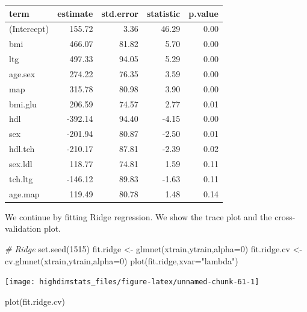\documentclass[
]{book}
\newenvironment{Shaded}{\begin{snugshade}}{\end{snugshade}}
\newcommand{\AttributeTok}[1]{\textcolor[rgb]{0.77,0.63,0.00}{#1}}
\newcommand{\CommentTok}[1]{\textcolor[rgb]{0.56,0.35,0.01}{\textit{#1}}}
\newcommand{\DecValTok}[1]{\textcolor[rgb]{0.00,0.00,0.81}{#1}}
\newcommand{\FunctionTok}[1]{\textcolor[rgb]{0.00,0.00,0.00}{#1}}
\newcommand{\NormalTok}[1]{#1}
\newcommand{\OtherTok}[1]{\textcolor[rgb]{0.56,0.35,0.01}{#1}}
\newcommand{\StringTok}[1]{\textcolor[rgb]{0.31,0.60,0.02}{#1}}
\begin{document}
\begin{tabular}{lrrrr}
\toprule
term & estimate & std.error & statistic & p.value\\
\midrule
(Intercept) & 155.72 & 3.36 & 46.29 & 0.00\\
bmi & 466.07 & 81.82 & 5.70 & 0.00\\
ltg & 497.33 & 94.05 & 5.29 & 0.00\\
age.sex & 274.22 & 76.35 & 3.59 & 0.00\\
map & 315.78 & 80.98 & 3.90 & 0.00\\
\addlinespace
bmi.glu & 206.59 & 74.57 & 2.77 & 0.01\\
hdl & -392.14 & 94.40 & -4.15 & 0.00\\
sex & -201.94 & 80.87 & -2.50 & 0.01\\
hdl.tch & -210.17 & 87.81 & -2.39 & 0.02\\
sex.ldl & 118.77 & 74.81 & 1.59 & 0.11\\
\addlinespace
tch.ltg & -146.12 & 89.83 & -1.63 & 0.11\\
age.map & 119.49 & 80.78 & 1.48 & 0.14\\
\bottomrule
\end{tabular}

We continue by fitting Ridge regression. We show the trace plot and the cross-validation plot.

\begin{Shaded}
\begin{Highlighting}[]
\CommentTok{\# Ridge}
\FunctionTok{set.seed}\NormalTok{(}\DecValTok{1515}\NormalTok{)}
\NormalTok{fit.ridge }\OtherTok{\textless{}{-}} \FunctionTok{glmnet}\NormalTok{(xtrain,ytrain,}\AttributeTok{alpha=}\DecValTok{0}\NormalTok{)}
\NormalTok{fit.ridge.cv }\OtherTok{\textless{}{-}} \FunctionTok{cv.glmnet}\NormalTok{(xtrain,ytrain,}\AttributeTok{alpha=}\DecValTok{0}\NormalTok{)}
\FunctionTok{plot}\NormalTok{(fit.ridge,}\AttributeTok{xvar=}\StringTok{"lambda"}\NormalTok{)}
\end{Highlighting}
\end{Shaded}

\begin{center}\texttt{[image: highdimstats\_files/figure-latex/unnamed-chunk-61-1]} \end{center}

\begin{Shaded}
\begin{Highlighting}[]
\FunctionTok{plot}\NormalTok{(fit.ridge.cv)}
\end{Highlighting}
\end{Shaded}
\end{document}
